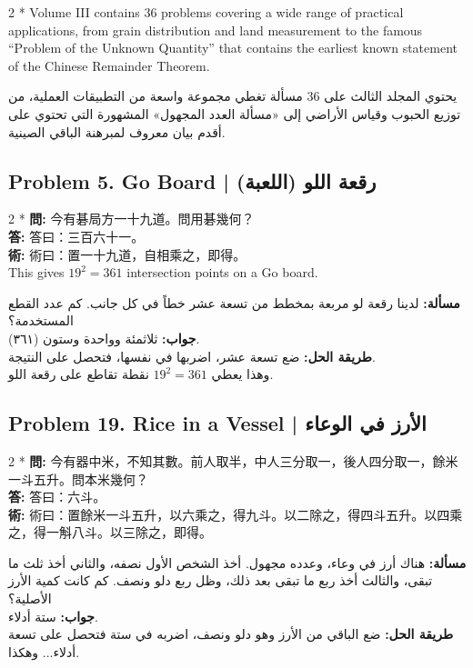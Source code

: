 \documentclass[11pt,a4paper]{article}
\newcommand{\ar}[1]{\arabicfont\beginR #1\endR}
\newcommand{\zh}[1]{{\CJKfamily{}#1}}
\begin{document}
\begin{paracol}{2}
\switchcolumn[0]*\noindent
Volume III contains 36 problems covering a wide range of practical applications, from grain distribution and land measurement to the famous ``Problem of the Unknown Quantity'' that contains the earliest known statement of the Chinese Remainder Theorem.

\switchcolumn
\noindent
\ar{يحتوي المجلد الثالث على 36 مسألة تغطي مجموعة واسعة من التطبيقات العملية، من توزيع الحبوب وقياس الأراضي إلى «مسألة العدد المجهول» المشهورة التي تحتوي على أقدم بيان معروف لمبرهنة الباقي الصينية.}
\end{paracol}

\subsection*{Problem 5. Go Board | \ar{رقعة اللو (اللعبة)}}

\begin{paracol}{2}
\switchcolumn[0]*\noindent
\textbf{\zh{問}:} \zh{今有碁局方一十九道。問用碁幾何？}\\
\textbf{\zh{答}:} \zh{答曰：三百六十一。}\\
\textbf{\zh{術}:} \zh{術曰：置一十九道，自相乘之，即得。}\\[3pt]
This gives $19^2 = 361$ intersection points on a Go board.

\switchcolumn
\noindent
\textbf{\ar{مسألة:}} \ar{لدينا رقعة لو مربعة بمخطط من تسعة عشر خطاً في كل جانب. كم عدد القطع المستخدمة؟}\\
\textbf{\ar{جواب:}} \ar{ثلاثمئة وواحدة وستون (٣٦١).}\\
\textbf{\ar{طريقة الحل:}} \ar{ضع تسعة عشر، اضربها في نفسها، فتحصل على النتيجة.}\\[3pt]
\ar{وهذا يعطي $19^2 = 361$ نقطة تقاطع على رقعة اللو.}
\end{paracol}

\subsection*{Problem 19. Rice in a Vessel | \ar{الأرز في الوعاء}}

\begin{paracol}{2}
\switchcolumn[0]*\noindent
\textbf{\zh{問}:} \zh{今有器中米，不知其數。前人取半，中人三分取一，後人四分取一，餘米一斗五升。問本米幾何？}\\
\textbf{\zh{答}:} \zh{答曰：六斗。}\\
\textbf{\zh{術}:} \zh{術曰：置餘米一斗五升，以六乘之，得九斗。以二除之，得四斗五升。以四乘之，得一斛八斗。以三除之，即得。}

\switchcolumn
\noindent
\textbf{\ar{مسألة:}} \ar{هناك أرز في وعاء، وعدده مجهول. أخذ الشخص الأول نصفه، والثاني أخذ ثلث ما تبقى، والثالث أخذ ربع ما تبقى بعد ذلك، وظل ربع دلو ونصف. كم كانت كمية الأرز الأصلية؟}\\
\textbf{\ar{جواب:}} \ar{ستة أدلاء.}\\
\textbf{\ar{طريقة الحل:}} \ar{ضع الباقي من الأرز وهو دلو ونصف، اضربه في ستة فتحصل على تسعة أدلاء... وهكذا.}
\end{paracol}
\end{document}
